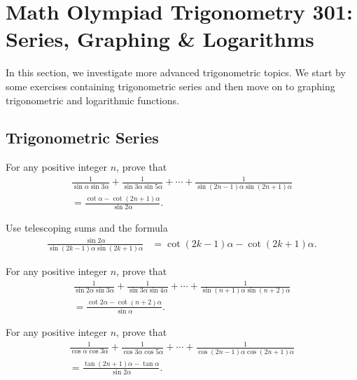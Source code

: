\documentclass[12pt,a4paper]{memoir}
\theoremstyle{definition}
\begin{document}
\section{Math Olympiad Trigonometry 301:\\ Series, Graphing \& Logarithms}

In this section, we investigate more advanced trigonometric topics. We start by some exercises containing trigonometric series and then move on to graphing trigonometric and logarithmic functions.

\subsection{Trigonometric Series}


\begin{question}
	For any positive integer $n$, prove that
	\begin{multline*}
		\frac{1}{\sin \alpha \sin 3\alpha}+\frac{1}{\sin 3\alpha \sin 5\alpha}+\cdots+\frac{1}{\sin (2n-1)\alpha \sin (2n+1)\alpha} \\= \frac{\cot \alpha - \cot(2n+1)\alpha}{\sin 2\alpha}.
	\end{multline*}
\end{question}

\begin{solution}
	Use telescoping sums and the formula
	\begin{align*}
		\frac{\sin 2 \alpha}{\sin (2k-1)\alpha \sin (2k+1)\alpha} &=\cot(2k-1)\alpha - \cot(2k+1)\alpha.
	\end{align*}
\end{solution}

\begin{question}
	For any positive integer $n$, prove that
	\begin{multline*}
		\frac{1}{\sin 2\alpha \sin 3\alpha}+\frac{1}{\sin 3\alpha \sin 4\alpha}+\cdots+\frac{1}{\sin (n+1)\alpha \sin (n+2)\alpha} \\ = \frac{\cot 2\alpha - \cot(n+2)\alpha}{\sin \alpha}.
	\end{multline*}
\end{question}

\begin{question}
	For any positive integer $n$, prove that
	\begin{multline*}
		\frac{1}{\cos \alpha \cos 3\alpha}+\frac{1}{\cos 3\alpha \cos 5\alpha}+\cdots+\frac{1}{\cos (2n-1)\alpha \cos (2n+1)\alpha} \\ = \frac{\tan(2n+1)\alpha - \tan\alpha}{\sin 2\alpha}.
	\end{multline*}
\end{question}
\end{document}
